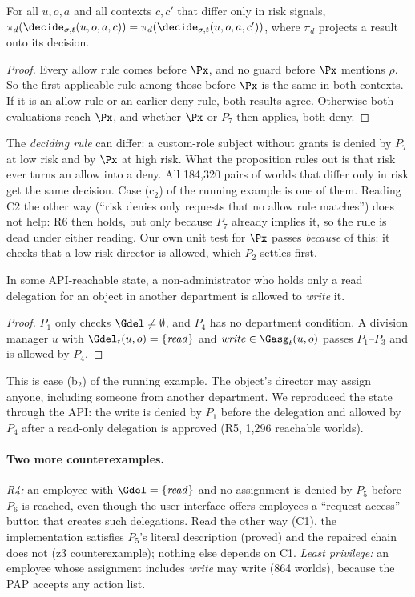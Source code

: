 \begin{proposition}\label{prop:inert}
For all $u,o,a$ and all contexts $c,c'$ that differ only in risk signals,
$\pi_d(\decide_{\sigma,t}(u,o,a,c))=\pi_d(\decide_{\sigma,t}(u,o,a,c'))$, where $\pi_d$ projects a result onto
its decision.
\end{proposition}
\begin{proof}
Every allow rule comes before $\Px$, and no guard before $\Px$ mentions $\rho$. So the first applicable rule
among those before $\Px$ is the same in both contexts. If it is an allow rule or an earlier deny rule, both
results agree. Otherwise both evaluations reach $\Px$, and whether $\Px$ or $P_7$ then applies, both deny.
\end{proof}
The \emph{deciding rule} can differ: a custom-role subject without grants is denied by $P_7$ at low risk and by
$\Px$ at high risk. What the proposition rules out is that risk ever turns an allow into a deny.
All 184{,}320 pairs of worlds that differ only in risk get the same decision. Case (c$_2$) of the running
example is one of them. Reading C2 the other way (``risk denies only requests that no allow rule matches'')
does not help: R6 then holds, but only because $P_7$ already implies it, so the rule is dead under either
reading. Our own unit test for $\Px$ passes \emph{because} of this: it checks that a low-risk director is
allowed, which $P_2$ settles first.

\begin{proposition}\label{prop:unlock}
In some API-reachable state, a non-administrator who holds only a read delegation for an object in another
department is allowed to \emph{write} it.
\end{proposition}
\begin{proof}
$P_1$ only checks $\Gdel\neq\emptyset$, and $P_4$ has no department condition. A division manager $u$ with
$\Gdel_t(u,o)=\{\mathit{read}\}$ and $\mathit{write}\in\Gasg_t(u,o)$ passes $P_1$--$P_3$ and is allowed by $P_4$.
\end{proof}
This is case (b$_2$) of the running example. The object's director may assign anyone, including someone from
another department. We reproduced the state through the API: the write is denied by $P_1$ before the
delegation and allowed by $P_4$ after a read-only delegation is approved (R5, 1{,}296 reachable worlds).

\paragraph{Two more counterexamples.} \emph{R4:} an employee with $\Gdel=\{\mathit{read}\}$ and no assignment is
denied by $P_5$ before $P_6$ is reached, even though the user interface offers employees a ``request access''
button that creates such delegations. Read the other way (C1), the implementation satisfies $P_5$'s
literal description (proved) and the repaired chain does not (z3 counterexample); nothing else depends on C1.
\emph{Least privilege:} an employee whose assignment includes \emph{write} may write (864 worlds), because the PAP
accepts any action list.


